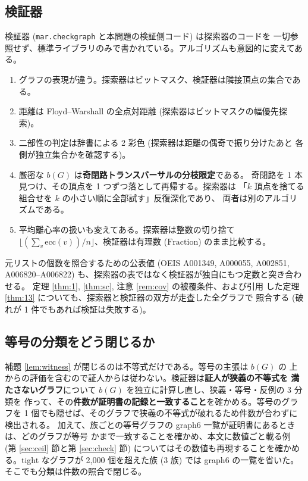 \documentclass[paper=a4,fontsize=10.5pt,jafontsize=10.5pt]{jlreq}
\theoremstyle{plain}
\theoremstyle{definition}
\begin{document}
\subsection{検証器}

検証器 (\texttt{mar.checkgraph} と本問題の検証側コード) は探索器のコードを
一切参照せず、標準ライブラリのみで書かれている。アルゴリズムも意図的に変えてある。

\begin{enumerate}
\item グラフの表現が違う。探索器はビットマスク、検証器は隣接頂点の集合である。
\item 距離は Floyd--Warshall の全点対距離 (探索器はビットマスクの幅優先探索)。
\item 二部性の判定は辞書による 2 彩色 (探索器は距離の偶奇で振り分けたあと
      各側が独立集合かを確認する)。
\item 厳密な $b(G)$ は\textbf{奇閉路トランスバーサルの分枝限定}である。
      奇閉路を 1 本見つけ、その頂点を 1 つずつ落として再帰する。探索器は
      「$k$ 頂点を捨てる組合せを $k$ の小さい順に全部試す」反復深化であり、
      両者は別のアルゴリズムである。
\item 平均離心率の扱いも変えてある。探索器は整数の切り捨て
      $\lfloor (\sum_v \mathrm{ecc}(v)) / n \rfloor$、検証器は有理数
      ($\mathrm{Fraction}$) のまま比較する。
\end{enumerate}

元リストの個数を照合するための公表値 (OEIS A001349, A000055, A002851,
A006820--A006822) も、探索器の表ではなく検証器が独自にもつ定数と突き合わせる。
定理 \ref{thm:1}, \ref{thm:sc}, 注意 \ref{rem:cov} の被覆条件、および引用
した定理 \ref{thm:13} についても、探索器と検証器の双方が走査した全グラフで
照合する (破れが 1 件でもあれば検証は失敗する)。

\subsection{等号の分類をどう閉じるか}\label{sec:tight}

補題 \ref{lem:witness} が閉じるのは不等式だけである。等号の主張は $b(G)$ の
上からの評価を含むので証人からは従わない。検証器は\textbf{証人が狭義の不等式を
満たさないグラフ}について $b(G)$ を独立に計算し直し、狭義・等号・反例の 3 分類を
作って、その\textbf{件数が証明書の記録と一致すること}を確かめる。等号のグラフを
1 個でも隠せば、そのグラフで狭義の不等式が破れるため件数が合わずに検出される。
加えて、族ごとの等号グラフの graph6 一覧が証明書にあるときは、どのグラフが等号
かまで一致することを確かめ、本文に数値ごと載る例 (第 \ref{sec:ceil} 節と第
\ref{sec:check} 節) についてはその数値も再現することを確かめる。tight なグラフが 2,000 個を超えた族 (3 族) では graph6 の一覧を省いた。そこでも分類は件数の照合で閉じる。
\end{document}
